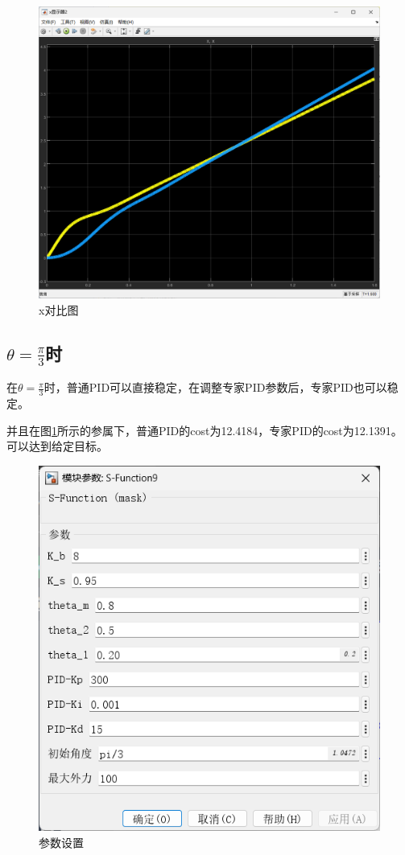 \documentclass[12pt,a4paper,UTF8]{article}
\begin{document}
\begin{figure}[!htbp]
    \begin{minipage}[b]{0.45\linewidth}
        \centering
        \includegraphics[width=0.9\linewidth]{figures/x_1.png}
        \caption{x对比图}
    \end{minipage}
\end{figure}


\newpage
\subsection{$\theta = \frac{\pi}{3}$时}
在$\theta = \frac{\pi}{3}$时，普通PID可以直接稳定，在调整专家PID参数后，专家PID也可以稳定。

并且在图\ref{para}所示的参属下，普通PID的cost为12.4184，专家PID的cost为12.1391。可以达到给定目标。

\begin{figure}[htbp]
    \centering
    \includegraphics[width=0.3\linewidth]{figures/para.png}
    \caption{参数设置}
    \label{para}
\end{figure}
\end{document}
